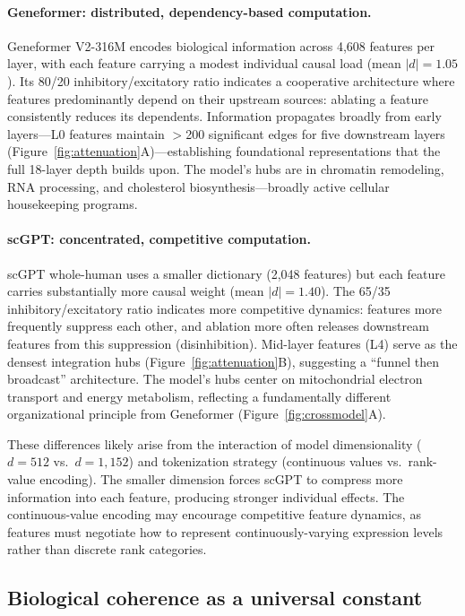 \documentclass[onecolumn]{article}
\begin{document}
\paragraph{Geneformer: distributed, dependency-based computation.}
Geneformer V2-316M encodes biological information across 4,608 features per layer, with each feature carrying a modest individual causal load (mean $|d| = 1.05$). Its 80/20 inhibitory/excitatory ratio indicates a cooperative architecture where features predominantly depend on their upstream sources: ablating a feature consistently reduces its dependents. Information propagates broadly from early layers---L0 features maintain $>$200 significant edges for five downstream layers (Figure~\ref{fig:attenuation}A)---establishing foundational representations that the full 18-layer depth builds upon. The model's hubs are in chromatin remodeling, RNA processing, and cholesterol biosynthesis---broadly active cellular housekeeping programs.

\paragraph{scGPT: concentrated, competitive computation.}
scGPT whole-human uses a smaller dictionary (2,048 features) but each feature carries substantially more causal weight (mean $|d| = 1.40$). The 65/35 inhibitory/excitatory ratio indicates more competitive dynamics: features more frequently suppress each other, and ablation more often releases downstream features from this suppression (disinhibition). Mid-layer features (L4) serve as the densest integration hubs (Figure~\ref{fig:attenuation}B), suggesting a ``funnel then broadcast'' architecture. The model's hubs center on mitochondrial electron transport and energy metabolism, reflecting a fundamentally different organizational principle from Geneformer (Figure~\ref{fig:crossmodel}A).

These differences likely arise from the interaction of model dimensionality ($d{=}512$ vs.\ $d{=}1{,}152$) and tokenization strategy (continuous values vs.\ rank-value encoding). The smaller dimension forces scGPT to compress more information into each feature, producing stronger individual effects. The continuous-value encoding may encourage competitive feature dynamics, as features must negotiate how to represent continuously-varying expression levels rather than discrete rank categories.

\subsection{Biological coherence as a universal constant}
\end{document}
